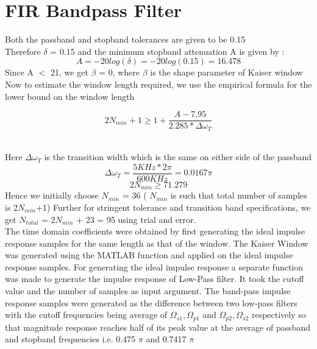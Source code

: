 \documentclass{article}
\begin{document}
\section{FIR Bandpass Filter}

Both the passband and stopband tolerances are given to be 0.15\\
Therefore $\delta$ = 0.15 and the minimum stopband attenuation A is given by :
\begin{equation*}
    A = -20log(\delta) = -20log(0.15) = 16.478 
\end{equation*}
Since A $<$ 21, we get $\beta$ = 0, where $\beta$ is the shape parameter of Kaiser window
Now to estimate the window length required, we use the empirical formula for the lower bound on
the window length

\begin{equation*}
    2N_{min} + 1 \geq 1+ \frac{A - 7.95}{2.285*\Delta \omega_T}
\end{equation*}\

Here $\Delta \omega_T$ is the transition width which is the same on either side of the passband
\begin{equation*}
    \Delta \omega_T = \frac{5KHz*2 \pi}{600KHz} = 0.0167 \pi
\end{equation*}
\begin{equation*}
    2N_{min} \geq 71.279 
\end{equation*}
Hence we initially choose $N_{min}$ = 36 ( $N_{min}$ is such that total number of samples is 2$N_{min}$+1) Further for stringent tolerance and transition band specifications, we get $N_{total}$ = 2$N_{min}$ + 23 = 95  using trial and error.\\

The time domain coefficients were obtained by first generating the ideal impulse response samples
for the same length as that of the window. The Kaiser Window was generated using the MATLAB
function and applied on the ideal impulse response samples. For generating the ideal impulse response a separate function was made to generate the impulse response of Low-Pass filter. It took the cutoff value and the number of samples as input argument. The band-pass impulse response samples were generated as the difference between two low-pass filters with the cutoff frequencies being average of $\Omega_{s1},\Omega_{p1}$ and $\Omega_{p2},\Omega_{s2}$ respectively so that magnitude response reaches half of its peak value at the average of passband and stopband frequencies i.e. 0.475 $\pi$ and 0.7417 $\pi$
\end{document}
